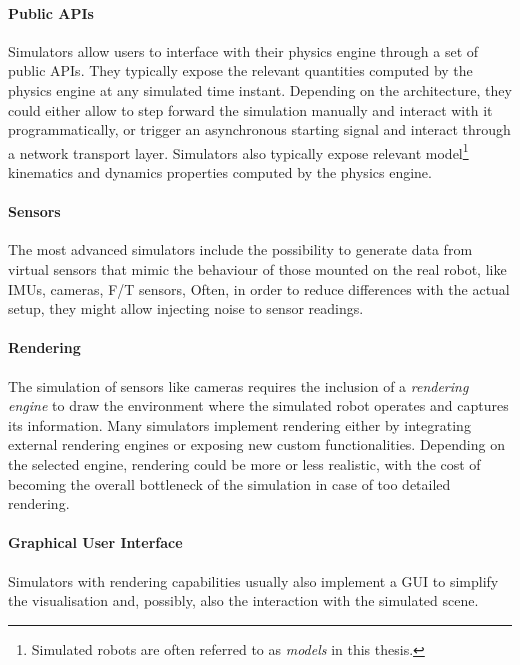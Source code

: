 \paragraph{Public APIs}

Simulators allow users to interface with their physics engine through a set of public \acp{API}.
They typically expose the relevant quantities computed by the physics engine at any simulated time instant.
Depending on the architecture, they could either allow to step forward the simulation manually and interact with it programmatically, or trigger an asynchronous starting signal and interact through a network transport layer.
Simulators also typically expose relevant model\footnote{Simulated robots are often referred to as \emph{models} in this thesis.} kinematics and dynamics properties computed by the physics engine.

\paragraph{Sensors}

The most advanced simulators include the possibility to generate data from virtual sensors that mimic the behaviour of those mounted on the real robot, like \acp{IMU}, cameras, \ac{F/T} sensors, \etc
Often, in order to reduce differences with the actual setup, they might allow injecting noise to sensor readings.

\paragraph{Rendering}

The simulation of sensors like cameras requires the inclusion of a \emph{rendering engine} to draw the environment where the simulated robot operates and captures its information.
Many simulators implement rendering either by integrating external rendering engines or exposing new custom functionalities.
Depending on the selected engine, rendering could be more or less realistic, with the cost of becoming the overall bottleneck of the simulation in case of too detailed rendering.

\paragraph{Graphical User Interface}

Simulators with rendering capabilities usually also implement a \ac{GUI} to simplify the visualisation and, possibly, also the interaction with the simulated scene.

